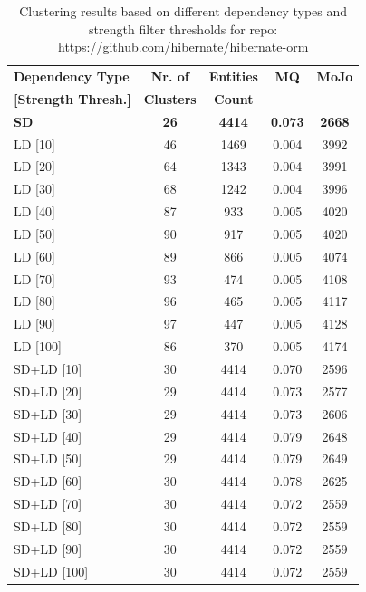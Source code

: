 \documentclass{ieeeaccess}
\begin{document}
\begin{table}
\caption{Clustering results based on different dependency types and strength filter thresholds for repo: \href{https://github.com/hibernate/hibernate-orm}{https://github.com/hibernate/hibernate-orm}}
\label{tab:clustering_results_hibernate}
\centering
\setlength{\tabcolsep}{3pt}
\begin{tabular}{|l|c|c|c|c|}
\hline
\textbf{Dependency Type} & \textbf{Nr. of} & \textbf{Entities} & \textbf{MQ} & \textbf{MoJo} \\
\textbf{[Strength Thresh.]} & \textbf{Clusters} & \textbf{Count} &  &  \\
\hline
\textbf{SD} & \textbf{26} & \textbf{4414} & \textbf{0.073} & \textbf{2668} \\
\hline
LD [10] & 46 & 1469 & 0.004 & 3992 \\
LD [20] & 64 & 1343 & 0.004 & 3991 \\
LD [30] & 68 & 1242 & 0.004 & 3996 \\
LD [40] & 87 & 933 & 0.005 & 4020 \\
LD [50] & 90 & 917 & 0.005 & 4020 \\
LD [60] & 89 & 866 & 0.005 & 4074 \\
LD [70] & 93 & 474 & 0.005 & 4108 \\
LD [80] & 96 & 465 & 0.005 & 4117 \\
LD [90] & 97 & 447 & 0.005 & 4128 \\
LD [100] & 86 & 370 & 0.005 & 4174 \\
\hline
SD+LD [10] & 30 & 4414 & 0.070 & 2596 \\
SD+LD [20] & 29 & 4414 & 0.073 & 2577 \\
SD+LD [30] & 29 & 4414 & 0.073 & 2606 \\
SD+LD [40] & 29 & 4414 & 0.079 & 2648 \\
SD+LD [50] & 29 & 4414 & 0.079 & 2649 \\
SD+LD [60] & 30 & 4414 & 0.078 & 2625 \\
SD+LD [70] & 30 & 4414 & 0.072 & 2559 \\
SD+LD [80] & 30 & 4414 & 0.072 & 2559 \\
SD+LD [90] & 30 & 4414 & 0.072 & 2559 \\
SD+LD [100] & 30 & 4414 & 0.072 & 2559 \\
\hline
\end{tabular}
\end{table}
\end{document}

